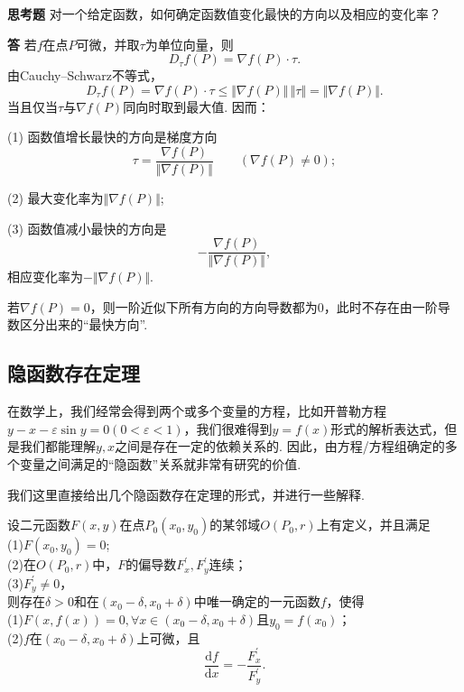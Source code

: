 \documentclass{ctexart}
\newenvironment{custom}[1]{\par\noindent \textbf{#1}\quad}{\par\vspace{1em}}
\begin{document}
\begin{custom}{思考题}
对一个给定函数，如何确定函数值变化最快的方向以及相应的变化率？
\end{custom}

\begin{custom}{答}
若$f$在点$P$可微，并取$\tau$为单位向量，则
\[
D_\tau f(P)=\nabla f(P)\cdot \tau.
\]
由Cauchy--Schwarz不等式，
\[
D_\tau f(P)=\nabla f(P)\cdot \tau\le \Vert \nabla f(P)\Vert \,\Vert \tau\Vert =\Vert \nabla f(P)\Vert .
\]
当且仅当$\tau$与$\nabla f(P)$同向时取到最大值. 因而：

(1) 函数值增长最快的方向是梯度方向
\[
\tau=\frac{\nabla f(P)}{\Vert \nabla f(P)\Vert }\qquad (\nabla f(P)\neq 0) ;
\]

(2) 最大变化率为$\Vert \nabla f(P)\Vert$;

(3) 函数值减小最快的方向是
\[
-\frac{\nabla f(P)}{\Vert \nabla f(P)\Vert },
\]
相应变化率为$-\Vert \nabla f(P)\Vert$.

若$\nabla f(P)=0$，则一阶近似下所有方向的方向导数都为$0$，此时不存在由一阶导数区分出来的“最快方向”. 
\end{custom}

\subsection{隐函数存在定理}
在数学上，我们经常会得到两个或多个变量的方程，比如开普勒方程$y-x-\varepsilon \sin{y}=0(0<\varepsilon<1)$，我们很难得到$y=f(x)$形式的解析表达式，但是我们都能理解$y,x$之间是存在一定的依赖关系的. 因此，由方程/方程组确定的多个变量之间满足的“隐函数”关系就非常有研究的价值.

我们这里直接给出几个隐函数存在定理的形式，并进行一些解释.
\begin{theorem}[二元函数的隐函数存在定理]
设二元函数$F(x,y)$在点$P_{0}(x_{0},y_{0})$的某邻域$O(P_{0},r)$上有定义，并且满足\\
(1)$F(x_{0},y_{0})=0$;\\
(2)在$O(P_{0},r)$中，$F$的偏导数$F_{x}^{\prime},F_{y}^{\prime}$连续；\\
(3)$F_{y}^{\prime}\neq 0$，\\
则存在$\delta>0$和在$(x_{0}-\delta,x_{0}+\delta)$中唯一确定的一元函数$f$，使得\\
(1)$F(x,f(x))=0,\forall x\in (x_{0}-\delta,x_{0}+\delta)$且$y_{0}=f(x_{0})$；\\
(2)$f$在$(x_{0}-\delta,x_{0}+\delta)$上可微，且
$$\frac{\mathrm{d}f}{\mathrm{d}x}=-\frac{F^{\prime}_{x}}{F^{\prime}_{y}}.$$
\end{theorem}
\end{document}
